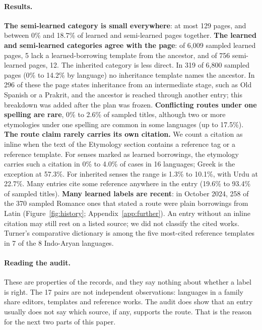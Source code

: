 \documentclass[11pt]{article}
\begin{document}
\paragraph{Results.} \textbf{The semi-learned category is small everywhere}: at most 129 pages, and between 0\% and 18.7\% of learned and semi-learned pages together. \textbf{The learned and semi-learned categories agree with the page}: of 6,009 sampled learned pages, 5 lack a learned-borrowing template from the ancestor, and of 756 semi-learned pages, 12. The inherited category is less direct. In 319 of 6,800 sampled pages (0\% to 14.2\% by language) no inheritance template names the ancestor. In 296 of these the page states inheritance from an intermediate stage, such as Old Spanish or a Prakrit, and the ancestor is reached through another entry; this breakdown was added after the plan was frozen. \textbf{Conflicting routes under one spelling are rare}, 0\% to 2.6\% of sampled titles, although two or more etymologies under one spelling are common in some languages (up to 17.5\%). \textbf{The route claim rarely carries its own citation.} We count a citation as inline when the text of the Etymology section contains a reference tag or a reference template. For senses marked as learned borrowings, the etymology carries such a citation in 0\% to 4.0\% of cases in 16 languages; Greek is the exception at 57.3\%. For inherited senses the range is 1.3\% to 10.1\%, with Urdu at 22.7\%. Many entries cite some reference anywhere in the entry (19.6\% to 93.4\% of sampled titles). \textbf{Many learned labels are recent}: in October 2024, 258 of the 370 sampled Romance ones that stated a route were plain borrowings from Latin (Figure~\ref{fig:history}; Appendix~\ref{app:further}). An entry without an inline citation may still rest on a listed source; we did not classify the cited works. Turner's comparative dictionary is among the five most-cited reference templates in 7 of the 8 Indo-Aryan languages.

\paragraph{Reading the audit.} These are properties of the records, and they say nothing about whether a label is right. The 17 pairs are not independent observations: languages in a family share editors, templates and reference works. The audit does show that an entry usually does not say which source, if any, supports the route. That is the reason for the next two parts of this paper.
\end{document}

